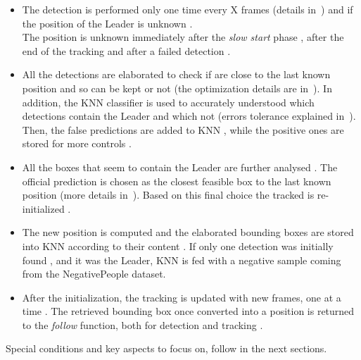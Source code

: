 \begin{itemize}
	\item The detection is performed  only one time every X frames (details in~) and if the position of the Leader is unknown .\\
	The position is unknown immediately after the \textit{slow start} phase , after the end of the tracking  and after a failed detection .
	
	\item All the detections are elaborated  to check if are close to the last known position  and so can be kept or not (the optimization details are in~). In addition, the KNN classifier is used  to accurately understood which detections contain the Leader and which not (errors tolerance explained in~).\\
	Then, the false predictions are added to KNN , while the positive ones are stored for more controls .
	
	\item All the boxes that seem to contain the Leader are further analysed . The official prediction is chosen as the closest feasible box to the last known position  (more details in~). Based on this final choice the tracked is re-initialized .
	
	\item The new position is computed  and the elaborated bounding boxes are stored into KNN according to their content . If only one detection was initially found , and it was the Leader, KNN is fed with a negative sample  coming from the NegativePeople dataset.
	
	\item After the initialization, the tracking is updated with new frames, one at a time . The retrieved bounding box once converted into a position  is returned to the \textit{follow} function, both for detection and tracking .
\end{itemize}
Special conditions and key aspects to focus on, follow in the next sections.

